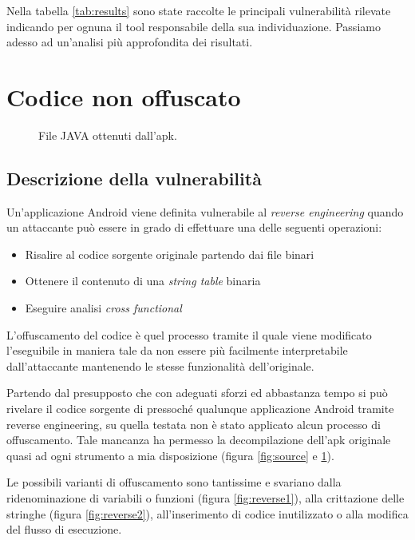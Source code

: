 Nella tabella \ref{tab:results} sono state raccolte le principali vulnerabilità rilevate indicando per ognuna il tool responsabile della sua individuazione. Passiamo adesso ad un'analisi più approfondita dei risultati.

\section{Codice non offuscato}

\begin{figure}[h]
	\centering 
	\caption{File JAVA ottenuti dall'apk.}
	\label{fig:sources}
\end{figure}

\subsection{Descrizione della vulnerabilità}

Un'applicazione Android viene definita vulnerabile al \emph{reverse engineering} quando un attaccante può essere in grado di effettuare una delle seguenti operazioni\cite{reverse}:
\begin{itemize}
	\item Risalire al codice sorgente originale partendo dai file binari
	\item Ottenere il contenuto di una \emph{string table} binaria
	\item Eseguire analisi \emph{cross functional}
\end{itemize}

L'offuscamento del codice è quel processo tramite il quale viene modificato l'eseguibile in maniera tale da non essere più facilmente interpretabile dall'attaccante mantenendo le stesse funzionalità dell'originale.

Partendo dal presupposto che con adeguati sforzi ed abbastanza tempo si può rivelare il codice sorgente di pressoché qualunque applicazione Android tramite  reverse engineering, su quella testata non è stato applicato alcun processo di offuscamento. Tale mancanza ha permesso la decompilazione dell'apk originale quasi ad ogni strumento a mia disposizione (figura \ref{fig:source} e \ref{fig:sources}).

Le possibili varianti di offuscamento sono tantissime e svariano dalla ridenominazione di variabili o funzioni (figura \ref{fig:reverse1}), alla crittazione delle stringhe (figura \ref{fig:reverse2}), all'inserimento di codice inutilizzato o alla modifica del flusso di esecuzione.

